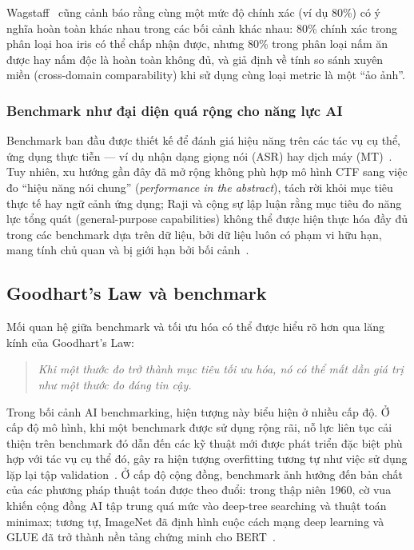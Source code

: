 Wagstaff~\cite{everything_benchmark} cũng cảnh báo rằng cùng một mức độ chính xác (ví dụ 80\%) có ý nghĩa hoàn toàn khác nhau trong các bối cảnh khác nhau: 80\% chính xác trong phân loại hoa iris có thể chấp nhận được, nhưng 80\% trong phân loại nấm ăn được hay nấm độc là hoàn toàn không đủ, và giả định về tính so sánh xuyên miền (cross-domain comparability) khi sử dụng cùng loại metric là một ``ảo ảnh''.

\subsubsection{Benchmark như đại diện quá rộng cho năng lực AI}

Benchmark ban đầu được thiết kế để đánh giá hiệu năng trên các tác vụ cụ thể, ứng dụng thực tiễn --- ví dụ nhận dạng giọng nói (ASR) hay dịch máy (MT)~\cite{everything_benchmark}. Tuy nhiên, xu hướng gần đây đã mở rộng không phù hợp mô hình CTF sang việc đo ``hiệu năng nói chung'' (\textit{performance in the abstract}), tách rời khỏi mục tiêu thực tế hay ngữ cảnh ứng dụng; Raji và cộng sự lập luận rằng mục tiêu đo năng lực tổng quát (general-purpose capabilities) không thể được hiện thực hóa đầy đủ trong các benchmark dựa trên dữ liệu, bởi dữ liệu luôn có phạm vi hữu hạn, mang tính chủ quan và bị giới hạn bởi bối cảnh~\cite{everything_benchmark}.

\subsection{Goodhart's Law và benchmark}

Mối quan hệ giữa benchmark và tối ưu hóa có thể được hiểu rõ hơn qua lăng kính của Goodhart's Law:

\begin{quote}
\textit{Khi một thước đo trở thành mục tiêu tối ưu hóa, nó có thể mất dần giá trị như một thước đo đáng tin cậy.}
\end{quote}

Trong bối cảnh AI benchmarking, hiện tượng này biểu hiện ở nhiều cấp độ. Ở cấp độ mô hình, khi một benchmark được sử dụng rộng rãi, nỗ lực liên tục cải thiện trên benchmark đó dẫn đến các kỹ thuật mới được phát triển đặc biệt phù hợp với tác vụ cụ thể đó, gây ra hiện tượng overfitting tương tự như việc sử dụng lặp lại tập validation~\cite{measuring_what_matters}. Ở cấp độ cộng đồng, benchmark ảnh hưởng đến bản chất của các phương pháp thuật toán được theo đuổi: trong thập niên 1960, cờ vua khiến cộng đồng AI tập trung quá mức vào deep-tree searching và thuật toán minimax; tương tự, ImageNet đã định hình cuộc cách mạng deep learning và GLUE đã trở thành nền tảng chứng minh cho BERT~\cite{everything_benchmark}.

